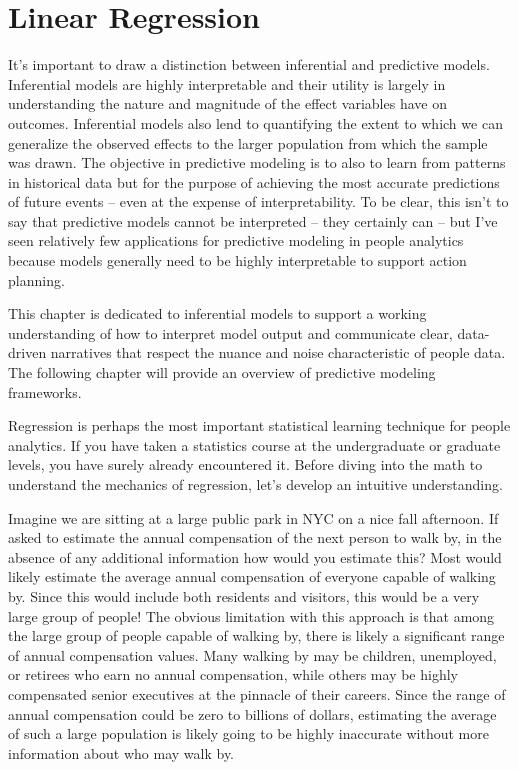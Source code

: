 \documentclass[]{book}
\begin{document}
\hypertarget{lm}{%
\chapter{Linear Regression}\label{lm}}

It's important to draw a distinction between inferential and predictive models. Inferential models are highly interpretable and their utility is largely in understanding the nature and magnitude of the effect variables have on outcomes. Inferential models also lend to quantifying the extent to which we can generalize the observed effects to the larger population from which the sample was drawn. The objective in predictive modeling is to also to learn from patterns in historical data but for the purpose of achieving the most accurate predictions of future events -- even at the expense of interpretability. To be clear, this isn't to say that predictive models cannot be interpreted -- they certainly can -- but I've seen relatively few applications for predictive modeling in people analytics because models generally need to be highly interpretable to support action planning.

This chapter is dedicated to inferential models to support a working understanding of how to interpret model output and communicate clear, data-driven narratives that respect the nuance and noise characteristic of people data. The following chapter will provide an overview of predictive modeling frameworks.

Regression is perhaps the most important statistical learning technique for people analytics. If you have taken a statistics course at the undergraduate or graduate levels, you have surely already encountered it. Before diving into the math to understand the mechanics of regression, let's develop an intuitive understanding.

Imagine we are sitting at a large public park in NYC on a nice fall afternoon. If asked to estimate the annual compensation of the next person to walk by, in the absence of any additional information how would you estimate this? Most would likely estimate the average annual compensation of everyone capable of walking by. Since this would include both residents and visitors, this would be a very large group of people! The obvious limitation with this approach is that among the large group of people capable of walking by, there is likely a significant range of annual compensation values. Many walking by may be children, unemployed, or retirees who earn no annual compensation, while others may be highly compensated senior executives at the pinnacle of their careers. Since the range of annual compensation could be zero to billions of dollars, estimating the average of such a large population is likely going to be highly inaccurate without more information about who may walk by.
\end{document}
